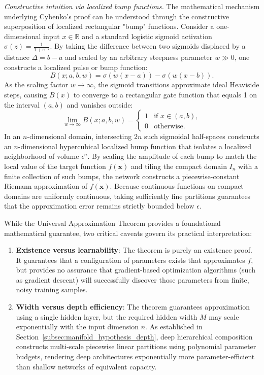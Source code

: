 \documentclass[../../../main.tex]{subfiles}
\begin{document}
\textit{Constructive intuition via localized bump functions.} The mathematical mechanism underlying Cybenko's proof can be understood through the constructive superposition of localized rectangular "bump" functions. Consider a one-dimensional input $x \in \mathbb{R}$ and a standard logistic sigmoid activation $\sigma(z) = \frac{1}{1 + e^{-z}}$. By taking the difference between two sigmoids displaced by a distance $\Delta = b - a$ and scaled by an arbitrary steepness parameter $w \gg 0$, one constructs a localized pulse or bump function:
\begin{equation}
B(x; a, b, w) = \sigma(w(x - a)) - \sigma(w(x - b)).
\end{equation}
As the scaling factor $w \to \infty$, the sigmoid transitions approximate ideal Heaviside steps, causing $B(x)$ to converge to a rectangular gate function that equals 1 on the interval $(a, b)$ and vanishes outside:
\begin{equation}
\lim_{w \to \infty} B(x; a, b, w) = \begin{cases} 
1 & \text{if } x \in (a, b), \\ 
0 & \text{otherwise}. 
\end{cases}
\end{equation}
In an $n$-dimensional domain, intersecting $2n$ such sigmoidal half-spaces constructs an $n$-dimensional hypercubical localized bump function that isolates a localized neighborhood of volume $\epsilon^n$. By scaling the amplitude of each bump to match the local value of the target function $f(\mathbf{x})$ and tiling the compact domain $I_n$ with a finite collection of such bumps, the network constructs a piecewise-constant Riemann approximation of $f(\mathbf{x})$. Because continuous functions on compact domains are uniformly continuous, taking sufficiently fine partitions guarantees that the approximation error remains strictly bounded below $\epsilon$.

While the Universal Approximation Theorem provides a foundational mathematical guarantee, two critical caveats govern its practical interpretation:
\begin{enumerate}[label=(\roman*)]
    \item \textbf{Existence versus learnability}: The theorem is purely an existence proof. It guarantees that a configuration of parameters exists that approximates $f$, but provides no assurance that gradient-based optimization algorithms (such as gradient descent) will successfully discover those parameters from finite, noisy training samples.
    \item \textbf{Width versus depth efficiency}: The theorem guarantees approximation using a single hidden layer, but the required hidden width $M$ may scale exponentially with the input dimension $n$. As established in Section~\ref{subsec:manifold_hypothesis_depth}, deep hierarchical composition constructs multi-scale piecewise linear partitions using polynomial parameter budgets, rendering deep architectures exponentially more parameter-efficient than shallow networks of equivalent capacity.
\end{enumerate}
\end{document}
